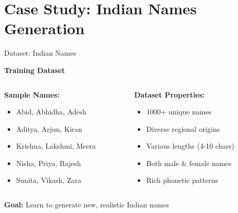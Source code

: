 \documentclass[usenames,dvipsnames]{beamer}
\begin{document}
\section{Case Study: Indian Names Generation}

\begin{frame}{Dataset: Indian Names}
\begin{center}
\textbf{Training Dataset}
\vspace{0.5cm}

\begin{columns}
\begin{column}{0.45\textwidth}
\textbf{Sample Names:}
\begin{itemize}
\item Abid, Abhidha, Adesh
\item Aditya, Arjun, Kiran
\item Krishna, Lakshmi, Meera
\item Nisha, Priya, Rajesh
\item Sunita, Vikash, Zara
\end{itemize}
\end{column}

\begin{column}{0.45\textwidth}
\textbf{Dataset Properties:}
\begin{itemize}
\item 1000+ unique names
\item Diverse regional origins
\item Various lengths (4-10 chars)
\item Both male \& female names
\item Rich phonetic patterns
\end{itemize}
\end{column}
\end{columns}

\vspace{0.7cm}
\textbf{Goal:} Learn to generate new, realistic Indian names
\end{center}
\end{frame}
\end{document}
